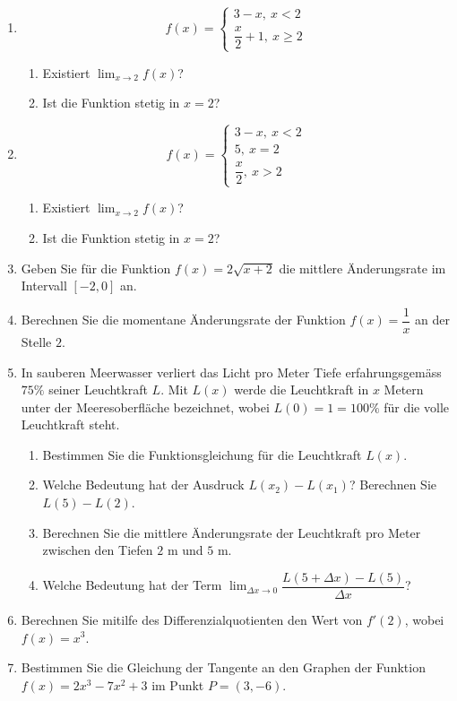 \begin{enumerate}
    \item \[f(x)=\begin{cases}
                  3-x,\ x<2 \\\dfrac{x}{2}+1,\ x\geq 2
              \end{cases}\]
          \begin{enumerate}
              \item Existiert $\displaystyle \lim_{x\to 2}f(x)$?
              \item Ist die Funktion stetig in $x=2$?
          \end{enumerate}
    \item \[f(x)=\begin{cases}
                  3-x,\ x<2 \\5,\ x=2\\\dfrac{x}{2},\ x> 2
              \end{cases}\]
          \begin{enumerate}
              \item Existiert $\displaystyle \lim_{x\to 2}f(x)$?
              \item Ist die Funktion stetig in $x=2$?
          \end{enumerate}

    \item Geben Sie für die Funktion $f(x)=2\sqrt{x+2}$ die mittlere Änderungsrate im Intervall $[-2,0]$ an.
    \item Berechnen Sie die momentane Änderungsrate der Funktion $f(x)=\dfrac{1}{x}$ an der Stelle $2$.
    \item In sauberen Meerwasser verliert das Licht pro Meter Tiefe erfahrungsgemäss $75\%$ seiner Leuchtkraft $L$. Mit $L(x)$ werde die Leuchtkraft in $x$ Metern unter der Meeresoberfläche bezeichnet, wobei $L(0)=1=100\%$ für die volle Leuchtkraft steht.
          \begin{enumerate}
              \item Bestimmen Sie die Funktionsgleichung für die Leuchtkraft $L(x)$.
              \item Welche Bedeutung hat der Ausdruck $L(x_2)-L(x_1)$? Berechnen Sie $L(5)-L(2)$.
              \item Berechnen Sie die mittlere Änderungsrate der Leuchtkraft pro Meter zwischen den Tiefen $2$ m und $5$ m.
              \item Welche Bedeutung hat der Term $\displaystyle \lim_{\Delta x \to 0}\dfrac{L(5+\Delta x)-L(5)}{\Delta x}$?
          \end{enumerate}
    \item Berechnen Sie mitilfe des Differenzialquotienten den Wert von $f'(2)$, wobei $f(x)=x^3$.
    \item Bestimmen Sie die Gleichung der Tangente an den Graphen der Funktion $f(x)=2x^3-7x^2+3$ im Punkt $P=(3,-6)$.
\end{enumerate}
\newpage

